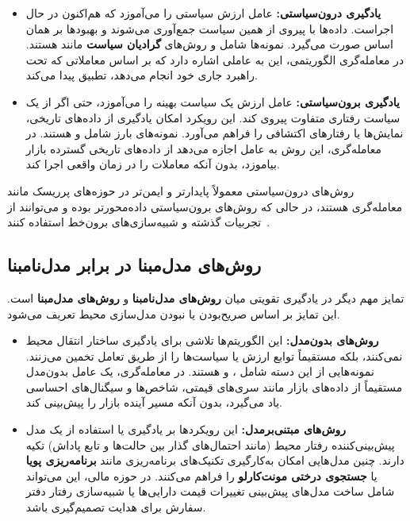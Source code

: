 \documentclass[12pt, a4paper]{report}
\begin{document}
\begin{itemize}
    \item \textbf{یادگیری درون‌سیاستی:} عامل ارزش سیاستی را می‌آموزد که هم‌اکنون در حال اجراست. داده‌ها با پیروی از همین سیاست جمع‌آوری می‌شوند و بهبودها بر همان اساس صورت می‌گیرد. نمونه‌ها شامل  و روش‌های \textbf{گرادیان سیاست} مانند  هستند. در معامله‌گری الگوریتمی، این به عاملی اشاره دارد که بر اساس معاملاتی که تحت راهبرد جاری خود انجام می‌دهد، تطبیق پیدا می‌کند.
    
    \item \textbf{یادگیری برون‌سیاستی:} عامل ارزش یک سیاست بهینه را می‌آموزد، حتی اگر از یک سیاست رفتاری متفاوت پیروی کند. این رویکرد امکان یادگیری از داده‌های تاریخی، نمایش‌ها یا رفتارهای اکتشافی را فراهم می‌آورد. نمونه‌های بارز شامل  و  هستند. در معامله‌گری، این روش به عامل اجازه می‌دهد از داده‌های تاریخی گسترده بازار بیاموزد، بدون آنکه معاملات را در زمان واقعی اجرا کند.
\end{itemize}

روش‌های درون‌سیاستی معمولاً پایدارتر و ایمن‌تر در حوزه‌های پرریسک مانند معامله‌گری هستند، در حالی که روش‌های برون‌سیاستی داده‌محورتر بوده و می‌توانند از تجربیات گذشته و شبیه‌سازی‌های برون‌خط استفاده کنند~\cite{sutton2018reinforcement}.  


\subsection{روش‌های مدل‌مبنا\protect{} در برابر مدل‌نامبنا\protect{}}

تمایز مهم دیگر در یادگیری تقویتی میان \textbf{روش‌های مدل‌نا‌مبنا} و \textbf{روش‌های مدل‌مبنا} است. این تمایز بر اساس صریح‌بودن یا نبودن مدل‌سازی محیط تعریف می‌شود. 
 
\begin{itemize}
    \item \textbf{روش‌های بدون‌مدل:} این الگوریتم‌ها تلاشی برای یادگیری ساختار انتقال محیط نمی‌کنند، بلکه مستقیماً توابع ارزش یا سیاست‌ها را از طریق تعامل تخمین می‌زنند. نمونه‌هایی از این دسته شامل ،  و  هستند. در معامله‌گری، یک عامل بدون‌مدل مستقیماً از داده‌های بازار مانند سری‌های قیمتی، شاخص‌ها و سیگنال‌های احساسی یاد می‌گیرد، بدون آنکه مسیر آینده بازار را پیش‌بینی کند.
    
    \item \textbf{روش‌های مبتنی‌بر‌مدل:} این رویکردها بر یادگیری یا استفاده از یک مدل پیش‌بینی‌کننده رفتار محیط (مانند احتمال‌های گذار بین حالت‌ها و تابع پاداش) تکیه دارند. چنین مدل‌هایی امکان به‌کارگیری تکنیک‌های برنامه‌ریزی مانند \textbf{برنامه‌ریزی پویا} یا \textbf{جستجوی درختی مونت‌کارلو} را فراهم می‌کنند. در حوزه مالی، این می‌تواند شامل ساخت مدل‌های پیش‌بینی تغییرات قیمت دارایی‌ها یا شبیه‌سازی رفتار دفتر سفارش برای هدایت تصمیم‌گیری باشد.
\end{itemize}
\end{document}
